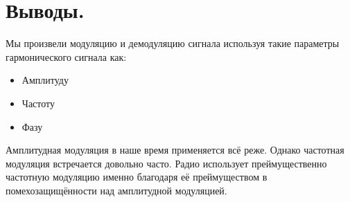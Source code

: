 \documentclass[a4paper,14pt]{extarticle}
\begin{document}
\section{Выводы.}

Мы произвели модуляцию и демодуляцию сигнала используя такие параметры гармонического сигнала как:
\begin{itemize}
\item Амплитуду 
\item Частоту
\item Фазу
\end{itemize}

Амплитудная модуляция в наше время применяется всё реже. Однако частотная модуляция встречается довольно часто. 
Радио использует преймущественно частотную модуляцию именно благодаря её преймуществом в помехозащищённости над амплитудной модуляцией.
\end{document}
